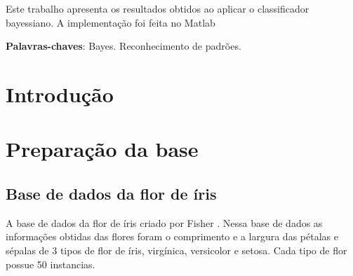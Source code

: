 \documentclass[ 
	article,			%
	11pt,				%
	oneside,			%
	a4paper,			%
	english,			%
	brazil,				%
	]{abntex2}
\begin{document}
\frenchspacing 


%
%
\maketitle

\begin{resumoumacoluna}
 Este trabalho apresenta os resultados obtidos ao aplicar o classificador
 bayessiano. A implementação foi feita no Matlab\texttrademark 
 
 
 \vspace{\onelineskip}
 
 \noindent
 \textbf{Palavras-chaves}: Bayes. Reconhecimento de padrões.
\end{resumoumacoluna}


\textual

\section*{Introdução}


\section{Preparação da base}
\subsection{Base de dados da flor de íris}
A base de dados da flor de íris criado por Fisher \cite{AHG2137}. Nessa base de
dados as informações obtidas das flores foram o comprimento e a largura das
pétalas e sépalas de 3 tipos de flor de íris, virgínica, versicolor e setosa.
Cada tipo de flor possue 50 instancias.
\end{document}
